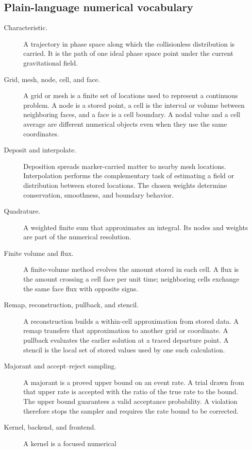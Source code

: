 \subsection{Plain-language numerical vocabulary}

\begin{description}
\item[Characteristic.] A trajectory in phase space along which the
      collisionless distribution is carried.  It is the path of one ideal
      phase space point under the current gravitational field.
\item[Grid, mesh, node, cell, and face.] A grid or mesh is a finite set of
      locations used to represent a continuous problem.  A node is a stored
      point, a cell is the interval or volume between neighboring faces, and a
      face is a cell boundary.  A nodal value and a cell average are different
      numerical objects even when they use the same coordinates.
\item[Deposit and interpolate.] Deposition spreads marker-carried matter to
      nearby mesh locations.  Interpolation performs the complementary task
      of estimating a field or distribution between stored locations.  The
      chosen weights determine conservation, smoothness, and boundary behavior.
\item[Quadrature.] A weighted finite sum that approximates an integral.  Its
      nodes and weights are part of the numerical resolution.
\item[Finite volume and flux.] A finite-volume method evolves the amount
      stored in each cell.  A flux is the amount crossing a cell face per unit
      time; neighboring cells exchange the same face flux with opposite signs.
\item[Remap, reconstruction, pullback, and stencil.] A reconstruction builds a
      within-cell approximation from stored data.  A remap transfers that
      approximation to another grid or coordinate.  A pullback evaluates the
      earlier solution at a traced departure point.  A stencil is the local set
      of stored values used by one such calculation.
\item[Majorant and accept--reject sampling.] A majorant is a proved upper
      bound on an event rate.  A trial drawn from that upper rate is accepted
      with the ratio of the true rate to the bound.  The upper bound guarantees a valid acceptance probability. A violation
      therefore stops the sampler and requires the rate bound to be corrected.
\item[Kernel, backend, and frontend.] A kernel is a focused numerical

\end{description}
